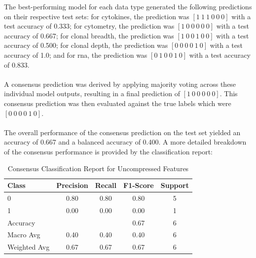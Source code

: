 \documentclass[12pt,a4paper]{report}
\begin{document}
\noindent
The best-performing model for each data type generated the following predictions on their respective test sets: for cytokines, the prediction was $[1\ 1\ 1\ 0\ 0\ 0]$ with a test accuracy of 0.333; for cytometry, the prediction was $[1\ 0\ 0\ 0\ 0\ 0]$ with a test accuracy of 0.667; for clonal breadth, the prediction was $[1\ 0\ 0\ 1\ 0\ 0]$ with a test accuracy of 0.500; for clonal depth, the prediction was $[0\ 0\ 0\ 0\ 1\ 0]$ with a test accuracy of 1.0; and for \acrshort{rna}, the prediction was $[0\ 1\ 0\ 0\ 1\ 0]$ with a test accuracy of 0.833.\\
\\
A consensus prediction was derived by applying majority voting across these individual model outputs, resulting in a final prediction of $[1\ 0\ 0\ 0\ 0\ 0]$. This consensus prediction was then evaluated against the true labels which were $[0\ 0\ 0\ 0\ 1\ 0]$.\\
\\
The overall performance of the consensus prediction on the test set yielded an accuracy of 0.667 and a balanced accuracy of 0.400. A more detailed breakdown of the consensus performance is provided by the classification report:
\begin{table}[h!]
    \centering
    \begin{tabular}{l c c c c}
        \toprule
        Class & Precision & Recall & F1-Score & Support \\
        \midrule
        0 & 0.80 & 0.80 & 0.80 & 5 \\
        1 & 0.00 & 0.00 & 0.00 & 1 \\
        \midrule
        Accuracy &       &      & 0.67 & 6 \\
        Macro Avg & 0.40 & 0.40 & 0.40 & 6 \\
        Weighted Avg & 0.67 & 0.67 & 0.67 & 6 \\
        \bottomrule
    \end{tabular}
    \caption[Consensus Classification Report Uncompressed Features]{Consensus Classification Report for Uncompressed Features}
    \label{tab:consensus_report_uncompressed}
\end{table}
\end{document}
